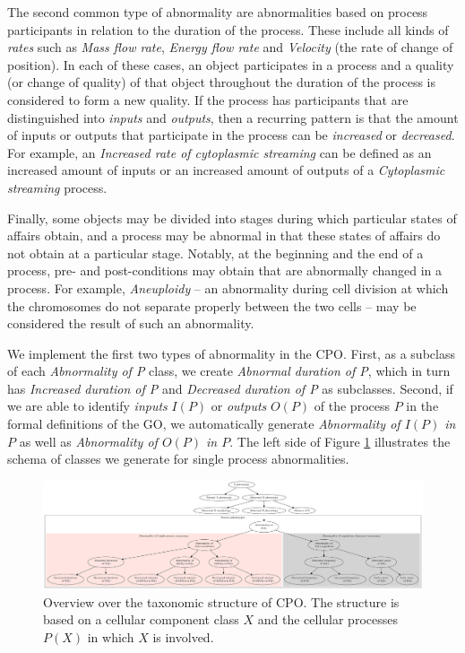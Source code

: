 \documentclass{bioinfo}
\begin{document}
The second common type of abnormality are abnormalities based on
process participants in relation to the duration of the process. These
include all kinds of {\em rates} such as {\em Mass flow rate}, {\em
  Energy flow rate} and {\em Velocity} (the rate of change of
position). In each of these cases, an object participates in a process
and a quality (or change of quality) of that object throughout the
duration of the process is considered to form a new quality. If the
process has participants that are distinguished into {\em inputs} and
{\em outputs}, then a recurring pattern is that the amount of inputs
or outputs that participate in the process can be {\em increased} or
{\em decreased}. For example, an {\em Increased rate of cytoplasmic
  streaming} can be defined as an increased amount of inputs or an
increased amount of outputs of a {\em Cytoplasmic streaming} process.

Finally, some objects may be divided into stages during which
particular states of affairs obtain, and a process may be abnormal in
that these states of affairs do not obtain at a particular
stage. Notably, at the beginning and the end of a process, pre- and
post-conditions may obtain that are abnormally changed in a
process. For example, {\em Aneuploidy} -- an abnormality during cell
division at which the chromosomes do not separate properly between the
two cells -- may be considered the result of such an abnormality.

We implement the first two types of abnormality in the CPO. First, as
a subclass of each {\em Abnormality of P} class, we create {\em
  Abnormal duration of P}, which in turn has {\em Increased duration
  of P} and {\em Decreased duration of P} as subclasses. Second, if we
are able to identify {\em inputs} $I(P)$ or {\em outputs} $O(P)$ of
the process $P$ in the formal definitions of the GO, we automatically
generate {\em Abnormality of $I(P)$ in $P$} as well as {\em
  Abnormality of $O(P)$ in $P$}.  The left side of Figure
\ref{fig:overview} illustrates the schema of classes we generate for
single process abnormalities.
\begin{figure}
  \centering
  \includegraphics[width=1\textwidth]{overview.eps}
  \caption{Overview over the taxonomic structure of CPO. The structure
    is based on a cellular component class $X$ and the cellular
    processes $P(X)$ in which $X$ is involved.\label{fig:overview}}
\end{figure}
\end{document}

